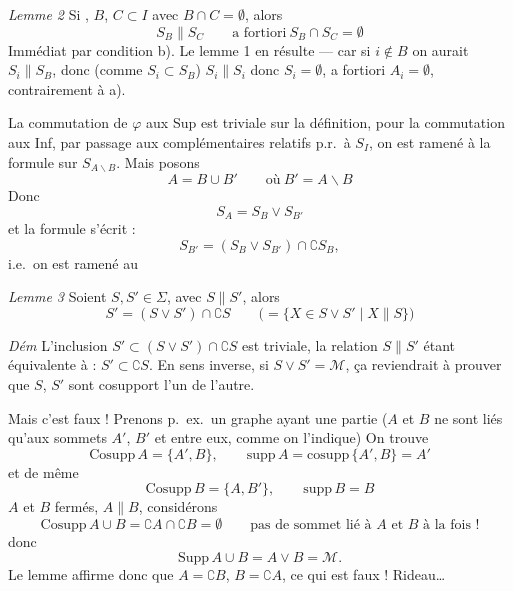 \documentclass[11pt,a4paper]{article}
\begin{document}
\emph{Lemme 2} Si , $B$, $C \subset I$ avec $B \cap C = \emptyset$, alors
\[
  S_B \parallel S_C \qquad \text{a fortiori}\ S_B \cap S_C = \emptyset
\]
Immédiat par condition b). Le lemme 1 en résulte — car si $i \notin B$ on aurait $S_i \parallel S_B$, donc (comme $S_i \subset S_B$) $S_i \parallel S_i$ donc $S_i = \emptyset$, a fortiori $A_i = \emptyset$, contrairement à a).

La commutation de $\varphi$ aux Sup est triviale sur la définition, pour la commutation aux Inf, par passage aux complémentaires relatifs p.r.\ à $S_I$, on est ramené à la formule sur $S_{A \smallsetminus B}$. Mais posons
\[
  A = B \cup B' \qquad \text{où}\ B' = A \smallsetminus B
\]
Donc
\[
  S_A = S_B \vee S_{B'}
\]
et la formule s'écrit :
\[
  S_{B'} = (S_B \vee S_{B'}) \cap \complement S_B ,
\]
i.e.\ on est ramené au

\emph{Lemme 3} Soient  $S, S' \in \Sigma$, avec $S \parallel S'$, alors
\[
  S' = (S \vee S') \cap \complement S \qquad \big( = \lbrace X \in S \vee S' \mid X \parallel S \rbrace \big)
\]

\emph{Dém} L'inclusion $S' \subset (S \vee S') \cap \complement S$ est triviale, la relation $S \parallel S'$ étant équivalente à : $S' \subset \complement S$. En sens inverse, si $S \vee S' = \mathcal{M}$, ça reviendrait à prouver que $S$, $S'$ sont cosupport l'un de l'autre.

Mais c'est faux ! Prenons p.\ ex.\ un graphe ayant une partie
($A$ et $B$ ne sont liés qu'aux sommets $A'$, $B'$ et entre eux, comme on l'indique) On trouve
\[
  \mathrm{Cosupp}\, A = \lbrace A', B \rbrace , \qquad \mathrm{supp}\, A = \mathrm{cosupp}\, \lbrace A', B \rbrace = A'
\]
et de même
\[
  \mathrm{Cosupp}\, B = \lbrace A, B' \rbrace , \qquad \mathrm{supp}\, B = B
\]
 $A$ et $B$ fermés, $A \parallel B$, considérons
\[
  \mathrm{Cosupp}\, A \cup B = \complement A \cap \complement B = \emptyset \qquad \text{pas de sommet lié à $A$ et $B$ à la fois !}
\]
donc
\[
  \mathrm{Supp}\, A \cup B = A \vee B = \mathcal{M} .
\]
Le lemme affirme donc que $A = \complement B$, $B = \complement A$, ce qui est faux ! Rideau\ldots
\end{document}
